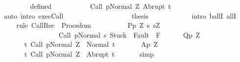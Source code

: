 \begin{isabellebody}
\ \ \ \ \ \ \ \ \isamarkupfalse%
\ defined\ \isanewline
\ \ \ \ \ \ \ \ \isamarkupfalse%
\ {\isachardoublequoteopen}{\isasymGamma}{\isasymturnstile}{\isasymlangle}Call\ p{\isacharcomma}Normal\ Z{\isasymrangle}\ {\isasymRightarrow}Abrupt\ t{\isachardoublequoteclose}\isanewline
\ \ \ \ \ \ \ \ \ \ \isamarkupfalse%
\ \ {\isacharparenleft}auto\ intro{\isacharcolon}\ exec{\isachardot}Call{\isacharparenright}\isanewline
\ \ \ \ \ \ \isamarkupfalse%
\isanewline
\ \ \ \ \isamarkupfalse%
\isanewline
\ \ \isacommand{{\isacharbraceright}}\isamarkupfalse%
\isanewline
\ \ \isamarkupfalse%
\ \isamarkupfalse%
\ {\isacharquery}thesis\isanewline
\ \ \ \ \isamarkupfalse%
\ {\isacharminus}\isanewline
\ \ \ \ \isamarkupfalse%
\ {\isacharparenleft}intro\ ballI\ allI{\isacharparenright}\isanewline
\ \ \ \ \isamarkupfalse%
\ {\isacharparenleft}rule\ CallRec{\isacharprime}\ {\isacharbrackleft}\ Procs{\isacharequal}{\isachardoublequoteopen}dom\ {\isasymGamma}{\isachardoublequoteclose}\ \ \ \isanewline
\ \ \ \ \ \ P{\isacharequal}{\isachardoublequoteopen}{\isasymlambda}p\ Z{\isachardot}\ {\isacharbraceleft}s{\isachardot}\ s{\isacharequal}Z\ {\isasymand}\ \isanewline
\ \ \ \ \ \ \ \ \ \ \ \ \ \ \ \ \ \ {\isasymGamma}{\isasymturnstile}{\isasymlangle}Call\ p{\isacharcomma}Normal\ s{\isasymrangle}\ {\isasymRightarrow}{\isasymnotin}{\isacharparenleft}{\isacharbraceleft}Stuck{\isacharbraceright}\ {\isasymunion}\ Fault\ {\isacharbackquote}\ {\isacharparenleft}{\isacharminus}F{\isacharparenright}{\isacharparenright}{\isacharbraceright}{\isachardoublequoteclose}\isanewline
\ \ \ \ \ \ Q{\isacharequal}{\isachardoublequoteopen}{\isasymlambda}p\ Z{\isachardot}\ \isanewline
\ \ \ \ \ \ \ \ {\isacharbraceleft}t{\isachardot}\ {\isasymGamma}{\isasymturnstile}{\isasymlangle}Call\ p{\isacharcomma}Normal\ Z{\isasymrangle}\ {\isasymRightarrow}\ Normal\ t{\isacharbraceright}{\isachardoublequoteclose}\ \isanewline
\ \ \ \ \ \ A{\isacharequal}{\isachardoublequoteopen}{\isasymlambda}p\ Z{\isachardot}\ \isanewline
\ \ \ \ \ \ \ \ {\isacharbraceleft}t{\isachardot}\ {\isasymGamma}{\isasymturnstile}{\isasymlangle}Call\ p{\isacharcomma}Normal\ Z{\isasymrangle}\ {\isasymRightarrow}\ Abrupt\ t{\isacharbraceright}{\isachardoublequoteclose}{\isacharbrackright}\ {\isacharparenright}\isanewline
\ \ \ \ \isamarkupfalse%
\ simp{\isacharplus}\isanewline
\ \ \ \ \isamarkupfalse%

\end{isabellebody}
